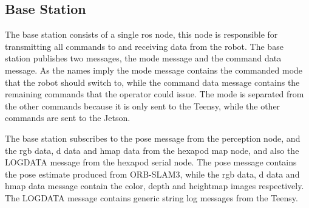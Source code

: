     \subsection{Base Station} \label{sec:base_ros}
        The base station consists of a single \ac{ros} node, this node is responsible for transmitting all commands to and receiving data from the robot. The base station publishes two messages, the mode message and the command data message. As the names imply the mode message contains the commanded mode that the robot should switch to, while the command data message contains the remaining commands that the operator could issue. The mode is separated from the other commands because it is only sent to the Teensy, while the other commands are sent to the Jetson.
        
        The base station subscribes to the pose message from the perception node, and the rgb data, d data and hmap data from the hexapod map node, and also the LOGDATA message from the hexapod serial node. The pose message contains the pose estimate produced from ORB-SLAM3, while the rgb data, d data and hmap data message contain the color, depth and heightmap images respectively. The LOGDATA message contains generic string log messages from the Teensy.
        
